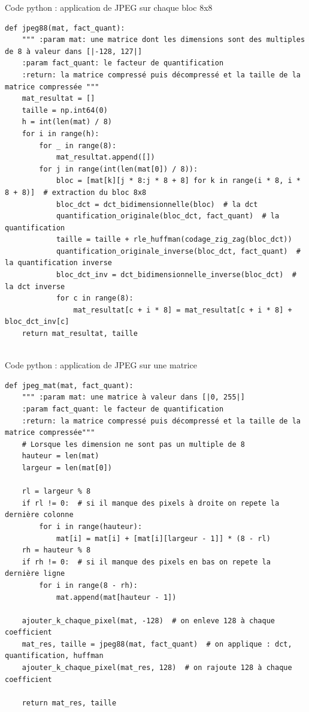 \documentclass[xcolor=dvipsnames]{beamer}
\begin{document}
\begin{frame}[fragile]{Code python : application de JPEG sur chaque bloc 8x8}
    \begin{lstlisting}[style=pythonStyle]
def jpeg88(mat, fact_quant):
    """ :param mat: une matrice dont les dimensions sont des multiples de 8 à valeur dans [|-128, 127|]
    :param fact_quant: le facteur de quantification
    :return: la matrice compressé puis décompressé et la taille de la matrice compressée """
    mat_resultat = []
    taille = np.int64(0)
    h = int(len(mat) / 8)
    for i in range(h):
        for _ in range(8):
            mat_resultat.append([])
        for j in range(int(len(mat[0]) / 8)):
            bloc = [mat[k][j * 8:j * 8 + 8] for k in range(i * 8, i * 8 + 8)]  # extraction du bloc 8x8
            bloc_dct = dct_bidimensionnelle(bloc)  # la dct
            quantification_originale(bloc_dct, fact_quant)  # la quantification
            taille = taille + rle_huffman(codage_zig_zag(bloc_dct))
            quantification_originale_inverse(bloc_dct, fact_quant)  # la quantification inverse
            bloc_dct_inv = dct_bidimensionnelle_inverse(bloc_dct)  # la dct inverse
            for c in range(8):
                mat_resultat[c + i * 8] = mat_resultat[c + i * 8] + bloc_dct_inv[c]
    return mat_resultat, taille
    
    \end{lstlisting}
\end{frame}

\begin{frame}[fragile]{Code python : application de JPEG sur une matrice}
    \begin{lstlisting}[style=pythonStyle]
def jpeg_mat(mat, fact_quant):
    """ :param mat: une matrice à valeur dans [|0, 255|]
    :param fact_quant: le facteur de quantification
    :return: la matrice compressé puis décompressé et la taille de la matrice compressée"""
    # Lorsque les dimension ne sont pas un multiple de 8
    hauteur = len(mat)
    largeur = len(mat[0])

    rl = largeur % 8
    if rl != 0:  # si il manque des pixels à droite on repete la dernière colonne
        for i in range(hauteur):
            mat[i] = mat[i] + [mat[i][largeur - 1]] * (8 - rl)
    rh = hauteur % 8
    if rh != 0:  # si il manque des pixels en bas on repete la dernière ligne
        for i in range(8 - rh):
            mat.append(mat[hauteur - 1])

    ajouter_k_chaque_pixel(mat, -128)  # on enleve 128 à chaque coefficient
    mat_res, taille = jpeg88(mat, fact_quant)  # on applique : dct, quantification, huffman
    ajouter_k_chaque_pixel(mat_res, 128)  # on rajoute 128 à chaque coefficient

    return mat_res, taille
    
    \end{lstlisting}
\end{frame}
\end{document}
